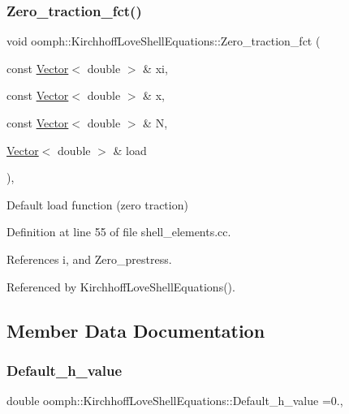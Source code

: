 \subsubsection{\texorpdfstring{Zero\+\_\+traction\+\_\+fct()}{Zero\_traction\_fct()}}
{\footnotesize\ttfamily void oomph\+::\+Kirchhoff\+Love\+Shell\+Equations\+::\+Zero\+\_\+traction\+\_\+fct (\begin{DoxyParamCaption}\item[{const \hyperlink{classoomph_1_1Vector}{Vector}$<$ double $>$ \&}]{xi,  }\item[{const \hyperlink{classoomph_1_1Vector}{Vector}$<$ double $>$ \&}]{x,  }\item[{const \hyperlink{classoomph_1_1Vector}{Vector}$<$ double $>$ \&}]{N,  }\item[{\hyperlink{classoomph_1_1Vector}{Vector}$<$ double $>$ \&}]{load }\end{DoxyParamCaption})\hspace{0.3cm}{\ttfamily [static]}, {\ttfamily [protected]}}



Default load function (zero traction) 



Definition at line 55 of file shell\+\_\+elements.\+cc.



References i, and Zero\+\_\+prestress.



Referenced by Kirchhoff\+Love\+Shell\+Equations().



\subsection{Member Data Documentation}
\mbox{\label{classoomph_1_1KirchhoffLoveShellEquations_a8f671ff89dbfd2fbe3afa9636ac5960a}} 
\subsubsection{\texorpdfstring{Default\+\_\+h\+\_\+value}{Default\_h\_value}}
{\footnotesize\ttfamily double oomph\+::\+Kirchhoff\+Love\+Shell\+Equations\+::\+Default\+\_\+h\+\_\+value =0.\hspace{0.3cm}{\ttfamily [static]}, {\ttfamily [private]}}



